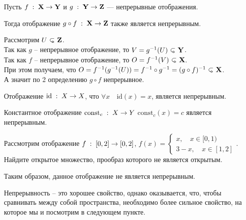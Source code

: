 \begin{Lem}
    Пусть $f\; : \; \mathbf{X} \to \mathbf{Y}$ и $g\; : \; \mathbf{Y} \to \mathbf{Z}$ --- непрерывные отображения.

    Тогда отображение $g\circ f \; : \; \mathbf{X} \to \mathbf{Z}$ также является непрерывным.
\end{Lem}
\begin{Proof}
    Рассмотрим $U\open \Z$.\\
    Так как $g$ -- непрерывное отображение, то $V = \inv g(U) \open \Y$.\\
    Так как $f$ -- непрерывное отображение, то $O = \inv f (V) \open \X$.\\
    При этом получаем, что $O = \inv f(\inv g(U)) = \inv f \circ \inv g = \inv{(g\circ f)} \open \X$.\\
    А значит по 2 определению $g\circ f$ непрерывное.
\end{Proof}

\begin{Ex}
    Отображение $\mathrm{id} \; : \; X \to X$, что $\forall x\quad \mathrm{id}(x) = x$, является непрерывным. 
\end{Ex}
\begin{Ex}
    Константное отображение $\mathrm{const}_c \; : \; X \to Y$ $\mathrm{const}_c(x) = c$ является непрерывным.
\end{Ex}
\begin{Task}
    Рассмотрим отображение $f \; : \; [0,2] \to [0,2]$, $f(x) = \begin{cases}
        x, \quad x\in [0, 1)\\ 3-x, \quad x\in [1,2]
    \end{cases}$. Найдите открытое множество, прообраз которого не является открытым. 

    Таким образом, данное отображение не является непрерывным.
\end{Task}

Непрерывность -- это хорошее свойство, однако оказывается, что, чтобы сравнивать между собой пространства, необходимо более сильное свойство, на которое мы и посмотрим в следующем пункте.
